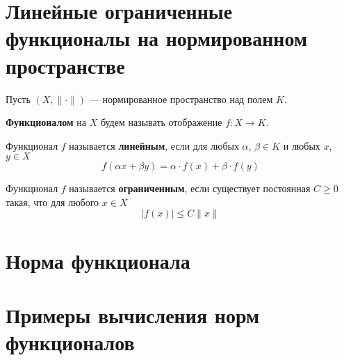 \documentclass[12pt]{article}
\newtheorem{definition}{\hskip\parindent Определение}%
\begin{document}
	\section{Линейные ограниченные функционалы на нормированном пространстве}
	Пусть $(X,\|\cdot\|)$ --- нормированное пространство над полем $K$.
	\begin{definition}
		\textbf{Функционалом} на $X$ будем называть отображение $f: X\to K$.
	\end{definition}
	\begin{definition}
		Функционал $f$ называется \textbf{линейным}, если для любых $\alpha$, $\beta\in K$ и любых $x$, $y\in X$
		\begin{equation*}
			f(\alpha x+\beta y)=\alpha\cdot f(x)+\beta\cdot f(y)
		\end{equation*}
	\end{definition}
	\begin{definition}
		Функционал $f$ называется \textbf{ограниченным}, если существует постоянная $C\geqslant0$ такая, что для любого $x\in X$
		\begin{equation*}
			|f(x)|\leqslant C\|x\|
		\end{equation*}
	\end{definition}
	\section{Норма функционала}
	\section{Примеры вычисления норм функционалов}
\end{document}

